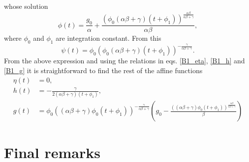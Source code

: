 \documentclass{article}
\begin{document}
whose solution
\begin{equation}
    \phi(t) = \frac{g_0}{\alpha} + \frac{\left(\phi_0 \left(\alpha\beta + \gamma\right) \left(t +  \phi_1\right)\right)^{\frac{\alpha\beta}{\alpha\beta + \gamma}}}{\alpha\beta},
\end{equation}
where $\phi_0$ and $\phi_1$ are integration constant. From this
\begin{equation}
    \psi(t) = \phi_0 \left(\phi_0 \left(\alpha\beta + \gamma\right)\left(t + \phi_1\right)\right)^{-\frac{\gamma}{\alpha\beta + \gamma}}.
\end{equation}
From the above expression and using the relations in eqs. \eqref{B1_eta}, \eqref{B1_h} and \eqref{B1_g} it is straightforward to find the rest of the
affine functions
\begin{align}
    \eta(t) & = 0,\\
    h(t) & = - \frac{\gamma}{2\left(\alpha\beta + \gamma\right)\left(t + \phi_1\right)},\\
    g(t) & = \phi_0 \left(\left(\alpha\beta + \gamma\right)\phi_0 \left(t + \phi_1\right)\right)^{-\frac{\gamma}{\alpha\beta + \gamma}}
    \left(g_0 - \frac{\left(\left(\alpha\beta + \gamma\right)\phi_0\left(t + \phi_1\right)\right)^{\frac{\alpha\beta}{\alpha\beta + \gamma}}}{\beta}\right)
\end{align}

\section{Final remarks}
\label{sec: final_remarks}



\end{document}
